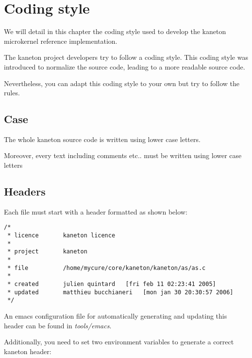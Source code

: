 
%
%

\chapter{Coding style}

We will detail in this chapter the coding style used to develop the
kaneton microkernel reference implementation.

\newpage

%
%

The kaneton project developers try to follow a coding style. This
coding style was introduced to normalize the source code, leading to a
more readable source code.

Nevertheless, you can adapt this coding style to your own but try to
follow the rules.

\section{Case}

The whole kaneton source code is written using lower case letters.

Moreover, every text including comments etc.. must be written using
lower case letters

%
%

\section{Headers}

Each file must start with a header formatted as shown below:

\begin{verbatim}
/*
 * licence       kaneton licence
 *
 * project       kaneton
 *
 * file          /home/mycure/core/kaneton/kaneton/as/as.c
 *
 * created       julien quintard   [fri feb 11 02:23:41 2005]
 * updated       matthieu bucchianeri   [mon jan 30 20:30:57 2006]
 */
\end{verbatim}

An emacs configuration file for automatically generating and updating
this header can be found in \textit{tools/emacs}.

Additionally, you need to set two environment variables to generate
a correct kaneton header:


